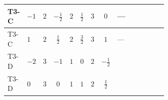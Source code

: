 \documentclass[8pt]{article}
\begin{document}
\begin{landscape}
\begin{longtable}{@{}llcccccc >{\raggedright\arraybackslash}p{0.21\linewidth} >{\raggedright\arraybackslash}p{0.21\linewidth} >{\raggedright\arraybackslash}p{0.21\linewidth}@{}}
\midrule
T3-C & $-1$ & $2$ & $-\frac{1}{2}$ & $2$ & $\frac{1}{2}$ & $3$ & $0$ & --- & \scriptsize\adjustbox{max width=\linewidth}{$\begin{gathered} +4 {\lambda_{12}^{(1)}} {\lambda_{HS_1}^{(1)}}\end{gathered}$} & \scriptsize\adjustbox{max width=\linewidth}{$\begin{gathered} +6 {\lambda_1} {\lambda_{HS_2}^{(1)}}\end{gathered}$} \\
\midrule
T3-C & $1$ & $2$ & $\frac{1}{2}$ & $2$ & $\frac{3}{2}$ & $3$ & $1$ & --- & \scriptsize\adjustbox{max width=\linewidth}{$\begin{gathered} +4 {\lambda_{12}^{(1)}} {\lambda_{HS_1}^{(1)}}\end{gathered}$} & \scriptsize\adjustbox{max width=\linewidth}{$\begin{gathered} +6 {\lambda_1} {\lambda_{HS_2}^{(1)}}\end{gathered}$} \\
\midrule
T3-D & $-2$ & $3$ & $-1$ & $1$ & $0$ & $2$ & $-\frac{1}{2}$ & \scriptsize\adjustbox{max width=\linewidth}{$\begin{gathered} -\frac{3 {g_1}^2 {\lambda_{HS_2}^{(1)}}}{2}\end{gathered}$} & \scriptsize\adjustbox{max width=\linewidth}{$\begin{gathered} +6 {\lambda_{12}^{(1)}} {\lambda_{HS_1}^{(1)}}\end{gathered}$} & \scriptsize\adjustbox{max width=\linewidth}{$\begin{gathered} +6 {\lambda_1} {\lambda_{HS_2}^{(1)}}\end{gathered}$} \\
\midrule
T3-D & $0$ & $3$ & $0$ & $1$ & $1$ & $2$ & $\frac{1}{2}$ & \scriptsize\adjustbox{max width=\linewidth}{$\begin{gathered} -\frac{15 {g_1}^2 {\lambda_{HS_2}^{(1)}}}{2}\end{gathered}$} & \scriptsize\adjustbox{max width=\linewidth}{$\begin{gathered} +6 {\lambda_{12}^{(1)}} {\lambda_{HS_1}^{(1)}}\end{gathered}$} & \scriptsize\adjustbox{max width=\linewidth}{$\begin{gathered} +6 {\lambda_1} {\lambda_{HS_2}^{(1)}}\end{gathered}$} \\
\midrule

\end{longtable}
\end{landscape}
\end{document}

